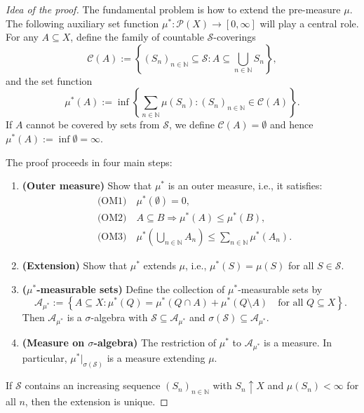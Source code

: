 \documentclass[12pt]{article}
\theoremstyle{definition}
\begin{document}
\begin{proof}[Idea of the proof]
The fundamental problem is how to extend the pre-measure $\mu$. The following auxiliary set function $\mu^* : \mathcal{P}(X) \to [0,\infty]$ will play a central role. For any $A \subseteq X$, define the family of countable $\mathcal{S}$-coverings
\[
\mathcal{C}(A) := \left\{ (S_n)_{n \in \mathbb{N}} \subseteq \mathcal{S} : A \subseteq \bigcup_{n \in \mathbb{N}} S_n \right\},
\]
and the set function
\[
\mu^*(A) := \inf \left\{ \sum_{n \in \mathbb{N}} \mu(S_n) : (S_n)_{n \in \mathbb{N}} \in \mathcal{C}(A) \right\}.
\]
If $A$ cannot be covered by sets from $\mathcal{S}$, we define $\mathcal{C}(A) = \emptyset$ and hence $\mu^*(A) := \inf \emptyset = \infty$.

The proof proceeds in four main steps:
\begin{enumerate}
    \item \textbf{(Outer measure)} Show that $\mu^*$ is an outer measure, i.e., it satisfies:
    \begin{align*}
        &\text{(OM1)} \quad \mu^*(\emptyset) = 0, \\
        &\text{(OM2)} \quad A \subseteq B \Rightarrow \mu^*(A) \leq \mu^*(B), \\
        &\text{(OM3)} \quad \mu^*\left( \bigcup_{n \in \mathbb{N}} A_n \right) \leq \sum_{n \in \mathbb{N}} \mu^*(A_n).
    \end{align*}

    \item \textbf{(Extension)} Show that $\mu^*$ extends $\mu$, i.e., $\mu^*(S) = \mu(S)$ for all $S \in \mathcal{S}$.

    \item \textbf{($\mu^*$-measurable sets)} Define the collection of $\mu^*$-measurable sets by
    \[
    \mathcal{A}_{\mu^*} := \left\{ A \subseteq X : \mu^*(Q) = \mu^*(Q \cap A) + \mu^*(Q \setminus A) \quad \text{for all } Q \subseteq X \right\}.
    \]
    Then $\mathcal{A}_{\mu^*}$ is a $\sigma$-algebra with $\mathcal{S} \subseteq \mathcal{A}_{\mu^*}$ and $\sigma(\mathcal{S}) \subseteq \mathcal{A}_{\mu^*}$.

    \item \textbf{(Measure on $\sigma$-algebra)} The restriction of $\mu^*$ to $\mathcal{A}_{\mu^*}$ is a measure. In particular, $\mu^*|_{\sigma(\mathcal{S})}$ is a measure extending $\mu$.
\end{enumerate}
If $\mathcal{S}$ contains an increasing sequence $(S_n)_{n \in \mathbb{N}}$ with $S_n \uparrow X$ and $\mu(S_n) < \infty$ for all $n$, then the extension is unique.
\end{proof}
\end{document}
